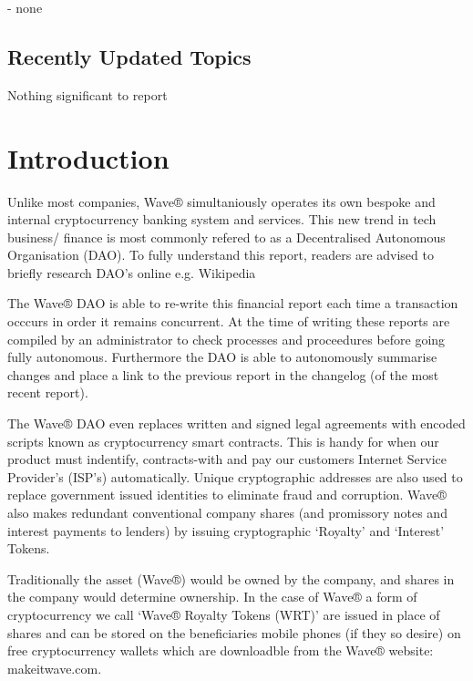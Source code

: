 \documentclass[letterpaper,10pt,english]{sphinxmanual}
\begin{document}
 - none


\section{Recently Updated Topics}
\label{\detokenize{releasenotes:recently-updated-topics}}
Nothing significant to report


\chapter{Introduction}
\label{\detokenize{introduction:introduction}}\label{\detokenize{introduction::doc}}
Unlike most companies, Wave® simultaniously operates its own bespoke and internal cryptocurrency banking system and services.
This new trend in tech business/ finance is most commonly refered to as a Decentralised Autonomous Organisation (DAO).
To fully understand this report, readers are advised to briefly research DAO’s online e.g. Wikipedia

\noindent{}

The Wave® DAO is able to re-write this financial report each time a transaction occcurs in order it remains concurrent.
At the time of writing these reports are compiled by an administrator to check processes and proceedures before going fully autonomous.
Furthermore the DAO is able to autonomously summarise changes and place a link to the previous report in the changelog (of the most recent report).

The Wave® DAO even replaces written and signed legal agreements with encoded scripts known as cryptocurrency smart contracts.
This is handy for when our product must indentify, contracts-with and pay our customers Internet Service Provider’s (ISP’s) automatically.
Unique cryptographic addresses are also used to replace government issued identities to eliminate fraud and corruption.
Wave® also makes redundant conventional company shares (and promissory notes and interest payments to lenders) by issuing cryptographic ‘Royalty’ and ‘Interest’ Tokens.

Traditionally the asset (Wave®) would be owned by the company, and shares in the company would determine ownership.
In the case of Wave® a form of cryptocurrency we call ‘Wave® Royalty Tokens (WRT)’ are issued in place of shares and can be stored on the beneficiaries mobile phones (if they so desire) on free cryptocurrency wallets which are downloadble from the Wave®  website: makeitwave.com.
\end{document}
